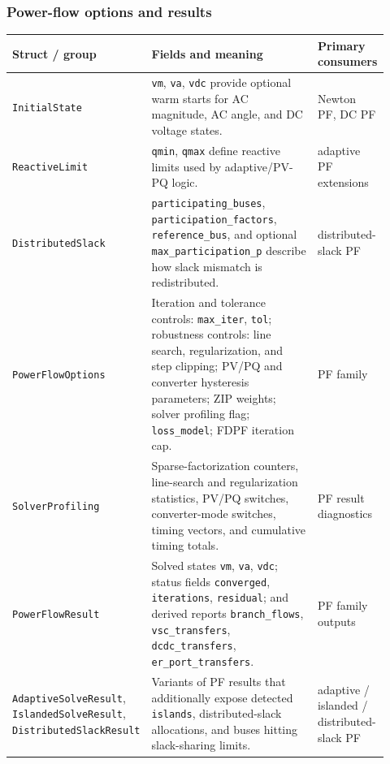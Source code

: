 \subsubsection*{Power-flow options and results}
\begin{longtable}{L{0.20\linewidth}L{0.53\linewidth}L{0.19\linewidth}}
\toprule
Struct / group & Fields and meaning & Primary consumers \\
\midrule
\endhead
\texttt{InitialState} & \texttt{vm}, \texttt{va}, \texttt{vdc} provide optional warm starts for AC magnitude, AC angle, and DC voltage states. & Newton PF, DC PF \\
\texttt{ReactiveLimit} & \texttt{qmin}, \texttt{qmax} define reactive limits used by adaptive/PV-PQ logic. & adaptive PF extensions \\
\texttt{DistributedSlack} & \texttt{participating\_buses}, \texttt{participation\_factors}, \texttt{reference\_bus}, and optional \texttt{max\_participation\_p} describe how slack mismatch is redistributed. & distributed-slack PF \\
\texttt{PowerFlowOptions} & Iteration and tolerance controls: \texttt{max\_iter}, \texttt{tol}; robustness controls: line search, regularization, and step clipping; PV/PQ and converter hysteresis parameters; ZIP weights; solver profiling flag; \texttt{loss\_model}; FDPF iteration cap. & PF family \\
\texttt{SolverProfiling} & Sparse-factorization counters, line-search and regularization statistics, PV/PQ switches, converter-mode switches, timing vectors, and cumulative timing totals. & PF result diagnostics \\
\texttt{PowerFlowResult} & Solved states \texttt{vm}, \texttt{va}, \texttt{vdc}; status fields \texttt{converged}, \texttt{iterations}, \texttt{residual}; and derived reports \texttt{branch\_flows}, \texttt{vsc\_transfers}, \texttt{dcdc\_transfers}, \texttt{er\_port\_transfers}. & PF family outputs \\
\texttt{AdaptiveSolveResult}, \texttt{IslandedSolveResult}, \texttt{DistributedSlackResult} & Variants of PF results that additionally expose detected \texttt{islands}, distributed-slack allocations, and buses hitting slack-sharing limits. & adaptive / islanded / distributed-slack PF \\
\bottomrule
\end{longtable}

